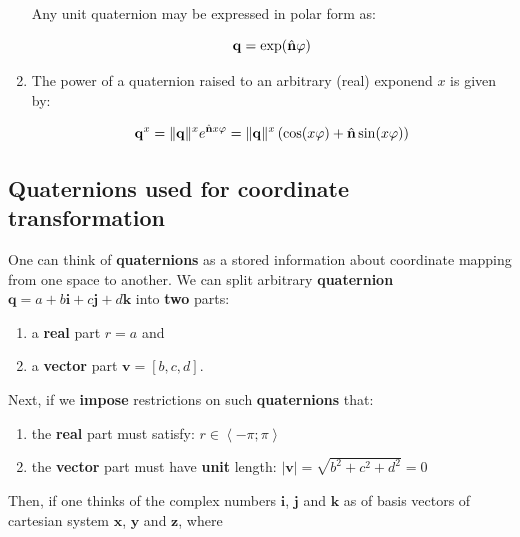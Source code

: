 \begin{enumerate}
        Any unit quaternion may be expressed in polar form as:

        \begin{equation}
            \mathbf{q} = \exp(\hat{\mathbf{n}} \varphi)
        \end{equation}

    \item The power of a quaternion raised to an arbitrary (real) exponend $ x $ is
        given by:

        \begin{equation}
            \mathbf{q}^x = \| {\mathbf{q}} \|^x e^{\hat{\mathbf{n}} x \varphi}
            = \| {\mathbf{q}} \|^x
            \left(\cos(x \varphi) + \hat{\mathbf{n}} \sin(x \varphi) \right)
        \end{equation}

\end{enumerate}


\subsection{Quaternions used for coordinate transformation}

One can think of \textbf{quaternions} as a stored information about coordinate
mapping from one space to another. We can split arbitrary \textbf{quaternion}\\
$ \mathbf{q} = a + b \mathbf{i} + c \mathbf{j} + d \mathbf{k} $ into \textbf{two} parts:

\begin{enumerate}
    \item a \textbf{real} part $ r = a $ and

    \item a \textbf{vector} part $ \mathbf{v} = \left[ b, c, d \right] $.

\end{enumerate}

Next, if we \textbf{impose} restrictions on such \textbf{quaternions} that:

\begin{enumerate}
    \item the \textbf{real} part must satisfy: $ r \in \left< -\pi; \pi \right> $

    \item the \textbf{vector} part must have \textbf{unit} length:
        $ | \textbf{v} | = \sqrt{b^2 + c^2 + d^2} = 0 $

\end{enumerate}

Then, if one thinks of the complex numbers $ \mathbf{i} $, $ \mathbf{j} $ and $ \mathbf{k} $
as of basis vectors of cartesian system $ \mathbf{x} $, $ \mathbf{y} $ and $ \mathbf{z} $, where

